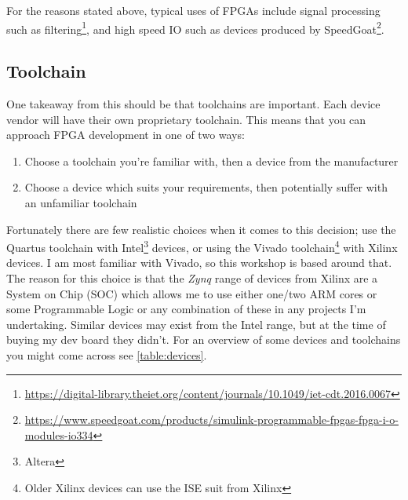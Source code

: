 \documentclass[11pt,a4paper]{article}
\begin{document}
For the reasons stated above, typical uses of FPGAs include signal processing such as filtering\footnote{\url{https://digital-library.theiet.org/content/journals/10.1049/iet-cdt.2016.0067}}, and high speed IO such as devices produced by SpeedGoat\footnote{\url{https://www.speedgoat.com/products/simulink-programmable-fpgas-fpga-i-o-modules-io334}}.
\subsection{Toolchain}
One takeaway from this should be that toolchains are important. Each device vendor will have their own proprietary toolchain. This means that you can approach FPGA development in one of two ways:
\begin{enumerate}
    \item Choose a toolchain you're familiar with, then a device from the manufacturer
    \item Choose a device which suits your requirements, then potentially suffer with an unfamiliar toolchain
\end{enumerate}

Fortunately there are few realistic choices when it comes to this decision; use the Quartus toolchain with Intel\footnote{Altera} devices, or using the Vivado toolchain\footnote{Older Xilinx devices can use the ISE suit from Xilinx} with Xilinx devices. I am most familiar with Vivado, so this workshop is based around that. The reason for this choice is that the \emph{Zynq} range of devices from Xilinx are a System on Chip (SOC) which allows me to use either one/two ARM cores or some Programmable Logic or any combination of these in any projects I'm undertaking. Similar devices may exist from the Intel range, but at the time of buying my dev board they didn't. For an overview of some devices and toolchains you might come across see \cref{table:devices}.
\end{document}

